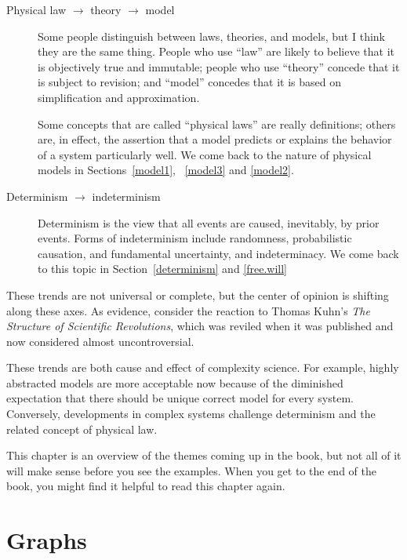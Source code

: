 \documentclass[10pt]{book}
\begin{document}
\begin{description}
\item[Physical law $\rightarrow$ theory $\rightarrow$ model]
  Some people distinguish between laws, theories, and models, but
  I think they are the same thing.
  People who use ``law'' are likely to
  believe that it is objectively true and immutable; people who use
  ``theory'' concede that it is subject to revision; and ``model''
  concedes that it is based on simplification and approximation.

  Some concepts that are called ``physical laws'' are really
  definitions; others are, in effect, the assertion that a model
  predicts or explains the behavior of a system particularly well.
  We come back to the nature of physical models 
  in Sections~\ref{model1}, ~\ref{model3} and \ref{model2}.

\item[Determinism $\rightarrow$ indeterminism] Determinism is the view
  that all events are caused, inevitably, by prior events.  Forms of
  indeterminism include randomness, probabilistic causation, and
  fundamental uncertainty, and indeterminacy.  We come back to this
  topic in Section~\ref{determinism} and \ref{free.will}

\end{description}

These trends are not universal or complete, but the center of
opinion is shifting along these axes.  As evidence, consider the
reaction to Thomas Kuhn's {\em The Structure of Scientific
  Revolutions}, which was reviled when it was published and
now considered almost uncontroversial.

These trends are both cause and effect of complexity science.  For
example, highly abstracted models are more acceptable now because of
the diminished expectation that there should be unique correct model
for every system.  Conversely, developments in complex systems
challenge determinism and the related concept of physical law.

This chapter is an overview of the themes coming up in the book, but
not all of it will make sense before you see the examples.  When you
get to the end of the book, you might find it helpful to read this
chapter again.


\chapter{Graphs}
\end{document}
